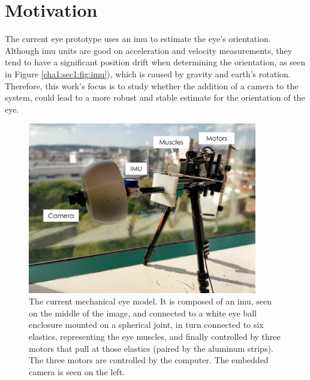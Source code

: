 \section{Motivation}
\label{cha1:motivation}

The current eye prototype uses an \acrfull{imu} to estimate the eye's orientation. Although \acrshort{imu} units are good on acceleration and velocity measurements, they tend to have a significant position drift when determining the orientation, as seen in Figure \ref{cha1:sec1:fig:imu}), which is caused by gravity and earth's rotation. Therefore, this work's focus is to study whether the addition of a camera to the system, could lead to a more robust and stable estimate for the orientation of the eye.

\begin{figure}[ht]
	\centering
	\includegraphics[width=10cm]{images/prototypenew.png}
	\caption[Current mechanical eye model]{The current mechanical eye model. It is composed of an \acrshort{imu}, seen on the middle of the image, and connected to a white eye ball enclosure mounted on a spherical joint, in turn connected to six elastics, representing the eye muscles, and finally controlled by three motors that pull at those elastics (paired by the aluminum strips). The three motors are controlled by the computer. The embedded camera is seen on the left.}
	\label{cha1:sec1:fig:curr_eye_model}
\end{figure}

